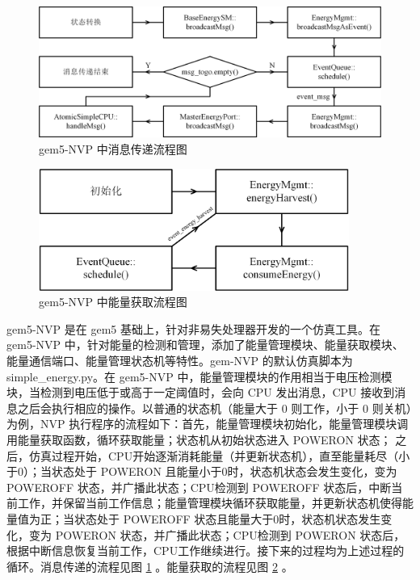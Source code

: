 \documentclass[a4paper,titlepage]{report}
\begin{document}
\begin{figure}[t]
\centering
\includegraphics[width = 6in]{msg_pass.jpg}
\caption{gem5-NVP 中消息传递流程图}
\label{msg_pass}
\end{figure}

\begin{figure}[t]
\centering
\includegraphics[width = 4in]{engy_harvest.jpg}
\caption{gem5-NVP 中能量获取流程图}
\label{engy_harvest}
\end{figure}

gem5-NVP \cite{gu2016nvpsim} 是在 gem5 基础上，针对非易失处理器开发的一个仿真工具。在 gem5-NVP 中，针对能量的检测和管理，添加了能量管理模块、能量获取模块、能量通信端口、能量管理状态机等特性。gem-NVP 的默认仿真脚本为 simple\_energy.py。在 gem5-NVP 中，能量管理模块的作用相当于电压检测模块，当检测到电压低于或高于一定阈值时，会向 CPU 发出消息，CPU 接收到消息之后会执行相应的操作。以普通的状态机（能量大于 0 则工作，小于 0 则关机）为例，NVP 执行程序的流程如下：首先，能量管理模块初始化，能量管理模块调用能量获取函数，循环获取能量；状态机从初始状态进入 POWERON 状态；
之后，仿真过程开始，CPU开始逐渐消耗能量（并更新状态机），直至能量耗尽（小于0）；当状态处于 POWERON 且能量小于0时，状态机状态会发生变化，变为 POWEROFF 状态，并广播此状态；CPU检测到 POWEROFF 状态后，中断当前工作，并保留当前工作信息；能量管理模块循环获取能量，并更新状态机使得能量值为正；当状态处于 POWEROFF 状态且能量大于0时，状态机状态发生变化，变为 POWERON 状态，并广播此状态；CPU检测到 POWERON 状态后，根据中断信息恢复当前工作，CPU工作继续进行。接下来的过程均为上述过程的循环。消息传递的流程见图 \ref{msg_pass} 。能量获取的流程见图 \ref{engy_harvest} 。
\end{document}
